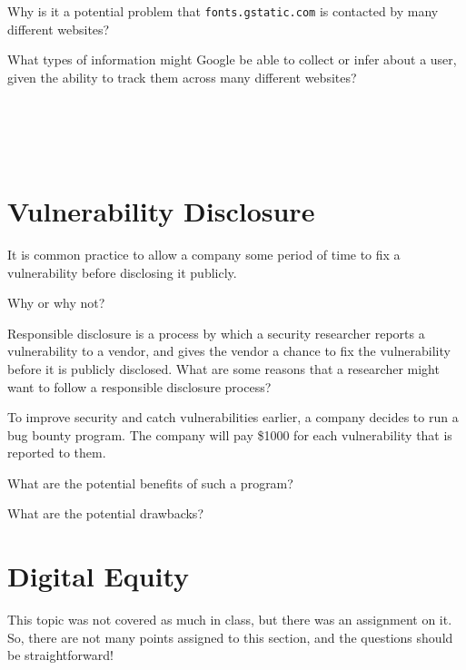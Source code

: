 Why is it a potential problem that {\tt fonts.gstatic.com} is contacted by many
different websites?\\
\eprob

What types of information might Google be able to collect or infer about a user, given
the ability to track them across many different websites?\\
\\
\\
\\
\\
\eprob


\newpage
\section*{Vulnerability Disclosure}

It is common practice to allow a company some period of time to fix a 
vulnerability before disclosing it publicly.  
\yesnono
\eprob

Why or why not?\\
\eprob

Responsible disclosure is a process by which a security researcher reports a
vulnerability to a vendor, and gives the vendor a chance to fix the
vulnerability before it is publicly disclosed.  What are some reasons that a
researcher might want to follow a responsible disclosure process?\\
\fi

To improve security and catch vulnerabilities earlier, a company decides to
run a bug bounty program.  The company will pay \$1000 for each vulnerability
that is reported to them.  

What are the potential benefits of such a program? \\
\eprob


What are the potential drawbacks? \\
\eprob

\newpage
\section*{Digital Equity}

This topic was not covered as much in class, but there was an assignment on
it. So, there are not many points assigned to this section, and the questions
should be straightforward!

